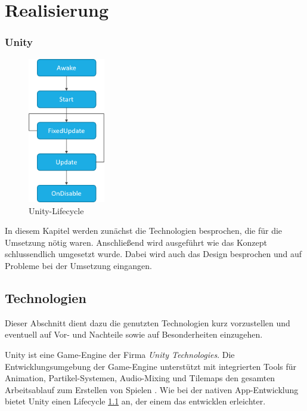 \chapter{Realisierung}
\label{cha:realisierung}

\subsection{Unity}
\begin{figure}
    \centering
    \includegraphics[width=0.3\textwidth]{img/realisierung/Lifecycle}
      \caption{Unity-Lifecycle}
      \label{fig:realisierung:technologien:lifecycle}
\end{figure}

In diesem Kapitel werden zunächst die Technologien besprochen, die für die Umsetzung nötig waren. Anschließend wird ausgeführt wie das Konzept schlussendlich umgesetzt wurde. Dabei wird auch das Design besprochen und auf Probleme bei der Umsetzung eingangen.

\section{Technologien}
\label{sec:grundlagen:technologien}
Dieser Abschnitt dient dazu die genutzten Technologien kurz vorzustellen und eventuell auf Vor- und Nachteile sowie auf Besonderheiten einzugehen.

\label{subsec:realisierung:technologien:unity}
Unity ist eine Game-Engine der Firma \textit{Unity Technologies}. Die Entwicklungsumgebung der Game-Engine unterstützt mit integrierten Tools für Animation, Partikel-Systemen, Audio-Mixing und Tilemaps den gesamten Arbeitsablauf zum Erstellen von Spielen \cite{unity_mobile}. Wie bei der nativen App-Entwicklung bietet Unity einen Lifecycle \ref{fig:realisierung:technologien:lifecycle} an, der einem das entwicklen erleichter. 

